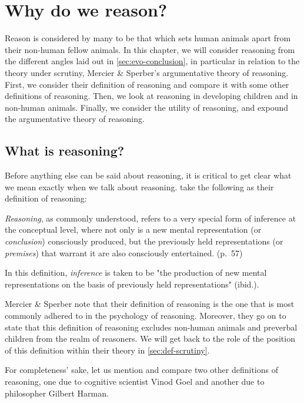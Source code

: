 \chapter{Why do we reason?}
\label{ch:reasoning}

Reason is considered by many to be that which sets human animals apart from their non-human fellow animals. In this chapter, we will consider reasoning from the different angles laid out in \cref{sec:evo-conclusion}, in particular in relation to the theory under scrutiny, Mercier \& Sperber's argumentative theory of reasoning. First, we consider their definition of reasoning and compare it with some other definitions of reasoning. Then, we look at reasoning in developing children and in non-human animals. Finally, we consider the utility of reasoning, and expound the argumentative theory of reasoning.

\section{What is reasoning?}

Before anything else can be said about reasoning, it is critical to get clear what we mean exactly when we talk about reasoning. \citet{MS11} take the following as their definition of reasoning:

\begin{quoting}
    \emph{Reasoning}, as commonly understood, refers to a very special form of inference at the conceptual level, where not only is a new mental representation (or \emph{conclusion}) consciously produced, but the previously held representations (or \emph{premises}) that warrant it are also consciously entertained.
    \hfill (p.~57)
\end{quoting}
In this definition, \emph{inference} is taken to be "the production of new mental representations on the basis of previously held representations" (ibid.).

Mercier \& Sperber note that their definition of reasoning is the one that is most commonly adhered to in the psychology of reasoning.
Moreover, they go on to state that this definition of reasoning excludes non-human animals and preverbal children from the realm of reasoners.
We will get back to the role of the position of this definition within their theory in \cref{sec:def-scrutiny}.

For completeness' sake, let us mention and compare two other definitions of reasoning, one due to cognitive scientist Vinod Goel and another due to philosopher Gilbert Harman.

